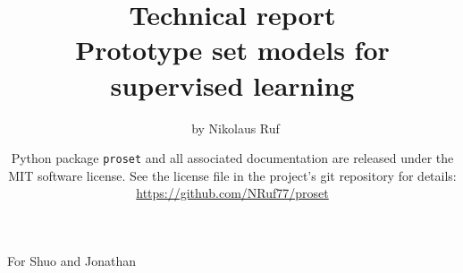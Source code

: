 \documentclass[a4paper, 11pt, openany]{book}
\title{\textbf{Technical report\\Prototype set models for supervised learning}}
\author{\Large\textcopyright\ by Nikolaus Ruf}
\date{
Python package \texttt{proset} and all associated documentation are released under the MIT software license.
See the license file in the project's git repository for details:\\
\url{https://github.com/NRuf77/proset}
}
\newcommand*{\1}{\ensuremath{\mathbb{1}}}
\begin{document}
\maketitle
%
\pagestyle{empty}
\begin{center}
\vspace*{2in}
\Large For Shuo and Jonathan
\end{center}
\newpage
\pagestyle{plain}
%
\frontmatter
{}
{}
\tableofcontents
%
\mainmatter





%
\appendix

\end{document}

